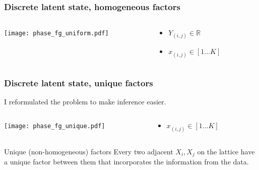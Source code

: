 \documentclass[compress]{beamer}
\begin{document}
\begin{frame}
  \frametitle{Discrete latent state, homogeneous factors}
  \begin{columns}
    \begin{column}{5cm}
      \texttt{[image: phase\_fg\_uniform.pdf]}
    \end{column}
    \begin{column}{5cm}
      \begin{itemize}
      \item $Y_{(i, j)} \in \mathbb{R}$
      \item $x_{(i, j)} \in [1 ... K]$
      \end{itemize}
    \end{column}
  \end{columns}
  
  

    


\end{frame}
  
\begin{frame}
  \frametitle{Discrete latent state, unique factors}
  I reformulated the problem to make inference easier. 
  
  \begin{columns}
    \begin{column}{5cm}
      \texttt{[image: phase\_fg\_unique.pdf]}
    \end{column}
    \begin{column}{5cm}
      \begin{itemize}
      \item $x_{(i, j)} \in [1 ... K]$
      \end{itemize}
    \end{column}
  \end{columns}
  
  \begin{block}{Unique (non-homogeneous) factors} 
    Every two adjacent $X_i, X_j$ on the lattice have a unique factor
    between them that incorporates the information from the data. 
  \end{block}
\end{frame} 
\end{document}
